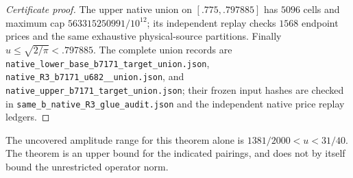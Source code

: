 \documentclass[11pt]{article}
\begin{document}
\begin{proof}[Certificate proof]
The upper native union on $[.775,.797885]$ has $5096$ cells and
maximum cap $563315250991/10^{12}$; its independent replay checks
$1568$ endpoint prices and the same exhaustive physical-source
partitions.  Finally $u\le\sqrt{2/\pi}<.797885$.
The complete union records are
\texttt{native\_\allowbreak lower\_\allowbreak base\_\allowbreak b7171\_\allowbreak target\_\allowbreak union.json},
\texttt{native\_\allowbreak R3\_\allowbreak b7171\_\allowbreak u682\_\_\allowbreak union.json}, and
\texttt{native\_\allowbreak upper\_\allowbreak b7171\_\allowbreak target\_\allowbreak union.json}; their frozen
input hashes are checked in
\texttt{same\_\allowbreak b\_\allowbreak native\_\allowbreak R3\_\allowbreak glue\_\allowbreak audit.json} and the independent
native price replay ledgers.
\end{proof}
The uncovered amplitude range for this theorem alone is
$1381/2000<u<31/40$.  The theorem is an upper bound for the indicated
pairings, and does not by itself bound the unrestricted operator norm.
\end{document}
